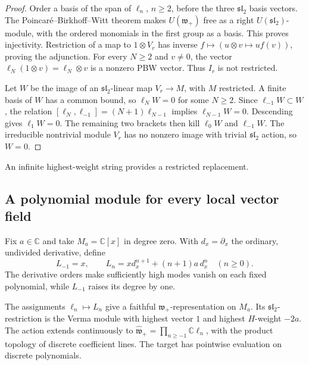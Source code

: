 \begin{proof}
Order a basis of the span of \(\ell_n\), \(n\geq2\), before
the three \(\mathfrak{sl}_2\) basis vectors. The
Poincar\'e--Birkhoff--Witt theorem makes \(U(\mathfrak w_+)\)
free as a right \(U(\mathfrak{sl}_2)\)-module, with the ordered
monomials in the first group as a basis. This proves injectivity.
Restriction of a map to \(1\otimes V_r\) has inverse
\(f\mapsto(u\otimes v\mapsto u f(v))\), proving the adjunction.
For every \(N\geq2\) and \(v\ne0\), the vector
\(\ell_N(1\otimes v)=\ell_N\otimes v\) is a nonzero PBW vector.
Thus \(I_r\) is not restricted.

Let \(W\) be the image of an \(\mathfrak{sl}_2\)-linear map
\(V_r\to M\), with \(M\) restricted. A finite basis of \(W\)
has a common bound, so \(\ell_NW=0\) for some \(N\geq2\).
Since \(\ell_{-1}W\subset W\), the relation
\([\ell_N,\ell_{-1}]=(N+1)\ell_{N-1}\) implies
\(\ell_{N-1}W=0\). Descending gives \(\ell_1W=0\).
The remaining two brackets then kill \(\ell_0W\) and
\(\ell_{-1}W\). The irreducible nontrivial module \(V_r\)
has no nonzero image with trivial \(\mathfrak{sl}_2\) action,
so \(W=0\).
\end{proof}

An infinite highest-weight string provides a restricted replacement.

\subsection{A polynomial module for every local vector field}

Fix\label{pcsm:def:polynomial-witt-module} \(a\in\mathbb C\) and take \(M_a=\mathbb C[x]\) in
degree zero. With \(d_x=\partial_x\) the ordinary, undivided
derivative, define
\begin{equation}\label{pcsm:eq:witt-polynomial}
 L_{-1}=x,\qquad
 L_n=xd_x^{n+1}+(n+1)a\,d_x^n\quad(n\geq0).
\end{equation}
The derivative orders make sufficiently high modes vanish on each
fixed polynomial, while \(L_{-1}\) raises its degree by one.

\begin{proposition}\label{pcsm:prop:witt-polynomial}
The assignments \(\ell_n\mapsto L_n\) give a faithful
\(\mathfrak w_+\)-representation on \(M_a\).
Its \(\mathfrak{sl}_2\)-restriction is the Verma module with
highest vector \(1\) and highest \(H\)-weight \(-2a\).
The action extends continuously to
\(\widehat{\mathfrak w}_+=\prod_{n\geq-1}\mathbb C\ell_n\),
with the product topology of discrete coefficient lines. The target
has pointwise evaluation on discrete polynomials.
\end{proposition}

